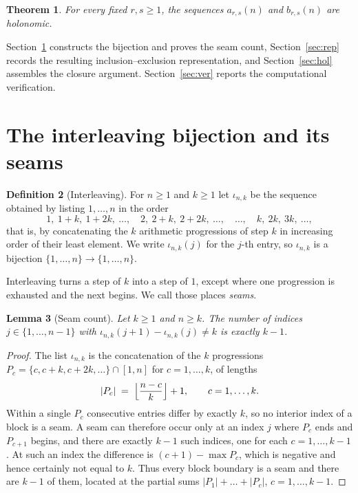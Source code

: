 \documentclass[11pt]{article}
\newtheorem{theorem}{Theorem}
\newtheorem{lemma}[theorem]{Lemma}
\theoremstyle{definition}
\newtheorem{definition}[theorem]{Definition}
\newcommand{\ars}{a_{r,s}}
\newcommand{\brs}{b_{r,s}}
\begin{document}
\begin{theorem}\label{thm:main}
For every fixed $r,s\ge 1$, the sequences $\ars(n)$ and $\brs(n)$ are
holonomic.
\end{theorem}

Section~\ref{sec:bij} constructs the bijection and proves the seam count,
Section~\ref{sec:rep} records the resulting inclusion--exclusion
representation, and Section~\ref{sec:hol} assembles the closure argument.
Section~\ref{sec:ver} reports the computational verification.

\section{The interleaving bijection and its seams}\label{sec:bij}

\begin{definition}[Interleaving]
For $n\ge 1$ and $k\ge 1$ let $\iota_{n,k}$ be the sequence obtained by
listing $1,\dots,n$ in the order
\[
  1,\ 1+k,\ 1+2k,\ \dots,\quad 2,\ 2+k,\ 2+2k,\ \dots,\quad \dots,\quad
  k,\ 2k,\ 3k,\ \dots,
\]
that is, by concatenating the $k$ arithmetic progressions of step $k$ in
increasing order of their least element. We write $\iota_{n,k}(j)$ for the
$j$-th entry, so $\iota_{n,k}$ is a bijection $\{1,\dots,n\}\to\{1,\dots,n\}$.
\end{definition}

Interleaving turns a step of $k$ into a step of $1$, except where one
progression is exhausted and the next begins. We call those places
\emph{seams}.

\begin{lemma}[Seam count]\label{lem:seams}
Let $k\ge 1$ and $n\ge k$. The number of indices $j\in\{1,\dots,n-1\}$ with
$\iota_{n,k}(j+1)-\iota_{n,k}(j)\neq k$ is exactly $k-1$.
\end{lemma}

\begin{proof}
The list $\iota_{n,k}$ is the concatenation of the $k$ progressions
$P_c=\{c,c+k,c+2k,\dots\}\cap[1,n]$ for $c=1,\dots,k$, of lengths
\begin{equation}\label{eq:blocklen}
  |P_c| \;=\; \Bigl\lfloor \frac{n-c}{k} \Bigr\rfloor + 1 ,
  \qquad c=1,\dots,k .
\end{equation}
Within a single $P_c$ consecutive entries differ by exactly $k$, so no interior
index of a block is a seam. A seam can therefore occur only at an index $j$
where $P_c$ ends and $P_{c+1}$ begins, and there are exactly $k-1$ such
indices, one for each $c=1,\dots,k-1$. At such an index the difference is
$(c+1)-\max P_c$, which is negative and hence certainly not equal to $k$. Thus
every block boundary is a seam and there are $k-1$ of them, located at the
partial sums $|P_1|+\dots+|P_c|$, $c=1,\dots,k-1$.
\end{proof}
\end{document}
